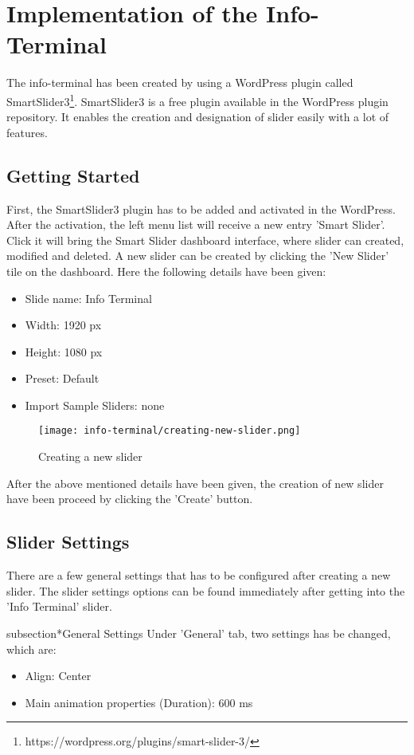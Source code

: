 \chapter{Implementation of the Info-Terminal}
The info-terminal has been created by using a WordPress plugin called SmartSlider3\footnote{https://wordpress.org/plugins/smart-slider-3/}. SmartSlider3 is a free plugin available in the WordPress plugin repository. It enables the creation and designation of slider easily with a lot of features.

\section{Getting Started}
First, the SmartSlider3 plugin has to be added and activated in the WordPress. After the activation, the left menu list will receive a new entry 'Smart Slider'. Click it will bring the Smart Slider dashboard interface, where slider can created, modified and deleted. A new slider can be created by clicking the 'New Slider' tile on the dashboard. Here the following details have been given:
\begin{itemize}
\item Slide name: Info Terminal
\item Width: 1920 px
\item Height: 1080 px
\item Preset: Default
\item Import Sample Sliders: none
\end{itemize}
\begin{figure}[h]
\caption{Creating a new slider}
\label{creating-a-new-slider}
\centering
\texttt{[image: info-terminal/creating-new-slider.png]}
\end{figure}

After the above mentioned details have been given, the creation of new slider have been proceed by clicking the 'Create' button.

\section{Slider Settings}
There are a few general settings that has to be configured after creating a new slider. The slider settings options can be found immediately after getting into the 'Info Terminal' slider.

subsection*{General Settings}
Under 'General' tab, two settings has be changed, which are:
\begin{itemize}
\item Align: Center
\item Main animation properties (Duration): 600 ms
\end{itemize}

